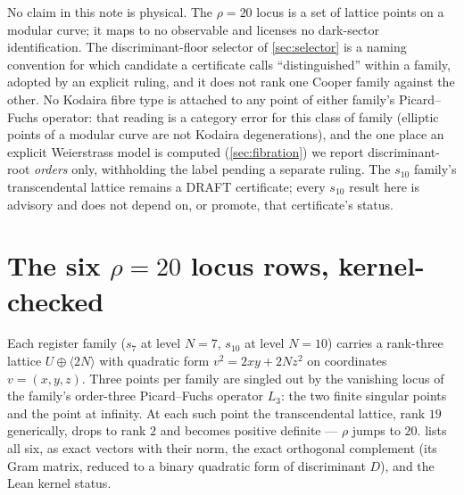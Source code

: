 \documentclass[11pt,a4paper]{article}
\theoremstyle{remark}
\newcommand{\tierA}{\colorbox{green!15}{\textsf{\scriptsize Tier A --- Lean kernel}}}
\newcommand{\tierB}{\colorbox{yellow!20}{\textsf{\scriptsize Tier B --- derived, not measured}}}
\newcommand{\tierL}{\colorbox{blue!10}{\textsf{\scriptsize Tier L --- literature}}}
\begin{document}
\begin{scopebox}
No claim in this note is physical. The $\rho=20$ locus is a set of lattice points on a modular curve; it
maps to no observable and licenses no dark-sector identification. The discriminant-floor selector of
\cref{sec:selector} is a naming convention for which candidate a certificate calls ``distinguished''
within a family, adopted by an explicit ruling, and it does not rank one Cooper family against the other.
No Kodaira fibre type is attached to any point of either family's Picard--Fuchs operator: that reading is
a category error for this class of family (elliptic points of a modular curve are not Kodaira
degenerations), and the one place an explicit Weierstrass model is computed (\cref{sec:fibration}) we
report discriminant-root \emph{orders} only, withholding the label pending a separate ruling. The
$s_{10}$ family's transcendental lattice remains a DRAFT certificate; every $s_{10}$ result here is
advisory and does not depend on, or promote, that certificate's status.
\end{scopebox}

\section{The six $\rho=20$ locus rows, kernel-checked}\label{sec:rows}

Each register family ($s_7$ at level $N=7$, $s_{10}$ at level $N=10$) carries a rank-three lattice
$U\oplus\langle 2N\rangle$ with quadratic form $v^2 = 2xy+2Nz^2$ on coordinates $v=(x,y,z)$. Three points
per family are singled out by the vanishing locus of the family's order-three Picard--Fuchs operator
$L_3$: the two finite singular points and the point at infinity. At each such point the transcendental
lattice, rank $19$ generically, drops to rank $2$ and becomes positive definite --- $\rho$ jumps to $20$.
 lists all six, as exact vectors with their norm, the exact orthogonal complement (its Gram
matrix, reduced to a binary quadratic form of discriminant $D$), and the Lean kernel status.

\begin{table}[h]
\centering

\caption{The six locus rows. \tierA\ for the lattice arithmetic (norm, saturated complement, Gram, reduced
form, frame determinant) of every row; three rows carry two independent kernel developments. \tierB: the
numeric recognition of $z$, and the identification of the orthogonal complement with the family's
transcendental lattice $T_X$ (Dolgachev 1996 \S7, Doran 1998 Thm.~5.13, \tierL). The index step
$|\det(\text{frame})| = |v^2|/\operatorname{div}(v)$ is checked per row, never proved in general, in
either kernel development.}\label{tab:rows}
\end{table}
\end{document}
